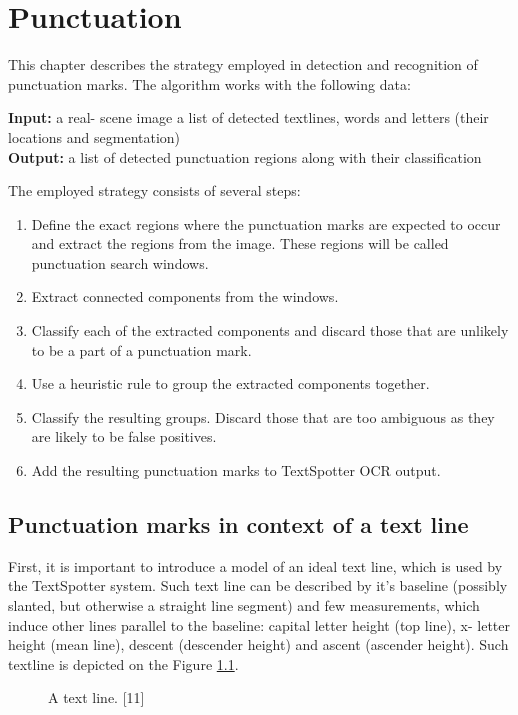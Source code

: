 \documentclass[12pt,a4paper]{report}
\begin{document}
\chapter{Punctuation}
This chapter describes the strategy employed in detection and recognition of punctuation marks. The algorithm works with the following data:

\textbf{Input:} a real- scene image a list of detected textlines, words and letters (their locations and segmentation) \\
\textbf{Output:} a list of detected punctuation regions along with their classification

The employed strategy consists of several steps:
\begin{enumerate}
    \item Define the exact regions where the punctuation marks are expected to occur and extract the regions from the image. These regions will be called punctuation search windows.
    \item Extract connected components from the windows.
    \item Classify each of the extracted components and discard those that are unlikely to be a part of a punctuation mark.
    \item Use a heuristic rule to group the extracted components together.
    \item Classify the resulting groups. Discard those that are too ambiguous as they are likely to be false positives.
    \item Add the resulting punctuation marks to TextSpotter OCR output.
\end{enumerate}

\section{Punctuation marks in context of a text line}
First, it is important to introduce a model of an ideal text line, which is used by the TextSpotter system. Such text line can be described by it's baseline (possibly slanted, but otherwise a straight line segment) and few measurements, which induce other lines parallel to the baseline: capital letter height (top line), x- letter height (mean line), descent (descender height) and ascent (ascender height). Such textline is depicted on the Figure \ref{fig:textline}.

\begin{figure}[htbp]
    \centering
    \caption{A text line. [11]}
    \label{fig:textline}
\end{figure}
\end{document}
